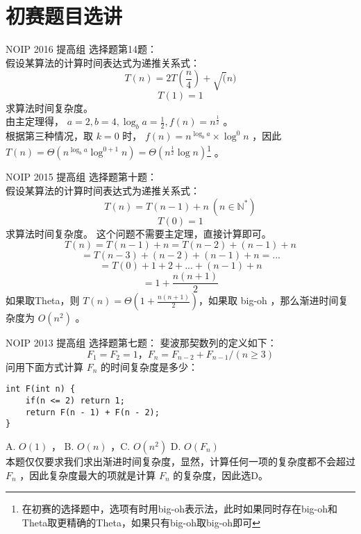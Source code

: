 \documentclass{beamer}
\begin{document}
\section{初赛题目选讲}
\begin{frame}
NOIP 2016 提高组 选择题第14题：\\ 
假设某算法的计算时间表达式为递推关系式：
$$T(n) = 2T(\frac{n}{4}) + \sqrt(n)$$
$$T(1) = 1$$
求算法时间复杂度。 \\ 
由主定理得， $a = 2, b = 4, \log_b a = \frac{1}{2}, f(n) = n^{\frac{1}{2}}$ 。 \\
根据第三种情况，取 $k = 0$ 时， $f(n) = n^{\log_b a} \times \log^0 n$ ，因此 $T(n) = \Theta(n^{\log_b a} \log^{0 + 1}n) = \Theta(n^{\frac{1}{2}} \log n)$\footnote{在初赛的选择题中，选项有时用big-oh表示法，此时如果同时存在big-oh和Theta取更精确的Theta，如果只有big-oh取big-oh即可} 。 
\end{frame}
\begin{frame}
NOIP 2015 提高组 选择题第十题：\\ 
假设某算法的计算时间表达式为递推关系式：\\ 
$$T(n) = T(n - 1) + n \ (n \in \mathbb{N}^*)$$
$$T(0) = 1$$
求算法时间复杂度。
这个问题不需要主定理，直接计算即可。
$$T(n) = T(n - 1) + n = T(n - 2) + (n - 1) + n$$
$$= T(n - 3) + (n - 2) + (n - 1) + n = ... $$
$$= T(0) + 1 + 2 + ... + (n - 1) + n$$
$$= 1 + \frac{n(n + 1)}{2}$$
如果取Theta，则 $T(n) = \Theta(1 + \frac{n(n + 1)}{2})$，如果取 big-oh ，那么渐进时间复杂度为 $O(n^2)$ 。
\end{frame}
\begin{frame}[fragile]
NOIP 2013 提高组 选择题第七题：
斐波那契数列的定义如下：
$$F_1 = F_2 = 1， F_n = F_{n - 2} + F_{n - 1} / (n \geq 3)$$
问用下面方式计算 $F_n$ 的时间复杂度是多少：
\begin{onlyenv}
\begin{verbatim}
int F(int n) {
    if(n <= 2) return 1;
    return F(n - 1) + F(n - 2);
}
\end{verbatim}
\end{onlyenv}
A. $O(1)$ ， B. $O(n)$ ，C. $O(n^2)$ D. $O(F_n)$ \\
本题仅仅要求我们求出渐进时间复杂度，显然，计算任何一项的复杂度都不会超过 $F_n$ ，因此复杂度最大的项就是计算 $F_n$ 的复杂度，因此选D。
\end{frame}
\end{document}
